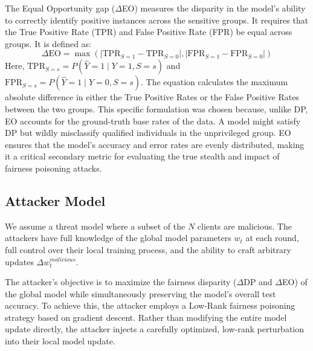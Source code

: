 \documentclass[journal]{IEEEtran}
\begin{document}
The Equal Opportunity gap ($\Delta$EO) measures the disparity in the model's ability to correctly identify positive instances across the sensitive groups. It requires that the True Positive Rate (TPR) and False Positive Rate (FPR) be equal across groups. It is defined as:
\begin{equation}
\Delta\text{EO} = \max\left( |\text{TPR}_{S=1} - \text{TPR}_{S=0}|, |\text{FPR}_{S=1} - \text{FPR}_{S=0}| \right)
\end{equation}
Here, $\text{TPR}_{S=s} = P(\hat{Y}=1 \mid Y=1, S=s)$ and $\text{FPR}_{S=s} = P(\hat{Y}=1 \mid Y=0, S=s)$. The equation calculates the maximum absolute difference in either the True Positive Rates or the False Positive Rates between the two groups. This specific formulation was chosen because, unlike DP, EO accounts for the ground-truth base rates of the data. A model might satisfy DP but wildly misclassify qualified individuals in the unprivileged group. EO ensures that the model's accuracy and error rates are evenly distributed, making it a critical secondary metric for evaluating the true stealth and impact of fairness poisoning attacks.

\subsection{Attacker Model}
We assume a threat model where a subset of the $N$ clients are malicious. The attackers have full knowledge of the global model parameters $w_t$ at each round, full control over their local training process, and the ability to craft arbitrary updates $\Delta w_t^{malicious}$. 

The attacker's objective is to maximize the fairness disparity ($\Delta$DP and $\Delta$EO) of the global model while simultaneously preserving the model's overall test accuracy. To achieve this, the attacker employs a Low-Rank fairness poisoning strategy based on gradient descent. Rather than modifying the entire model update directly, the attacker injects a carefully optimized, low-rank perturbation into their local model update.
\end{document}

